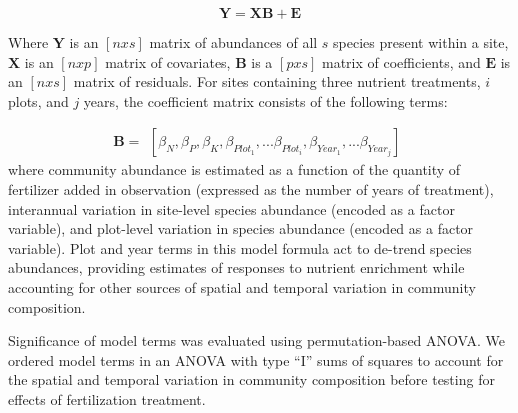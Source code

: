\documentclass[twoside,12pt,final]{ucthesis-CA2012}
\begin{document}
\begin{ucmainmatter}
\[\mathbf{Y} = \mathbf{XB} + \mathbf{E}\]

Where \(\mathbf{Y}\) is an \([n x s]\) matrix of abundances of all \(s\) species present within a site, \(\mathbf{X}\) is an \([n x p]\) matrix of covariates, \(\mathbf{B}\) is a \([p x s]\) matrix of coefficients, and \(\mathbf{E}\) is an \([n x s]\) matrix of residuals. For sites containing three nutrient treatments, \(i\) plots, and \(j\) years, the coefficient matrix consists of the following terms:

\[\mathbf{B} = \begin{matrix}
    [{\beta}_N, {\beta}_P , {\beta}_K, {\beta}_{Plot_1}, ... {\beta}_{Plot_i},
    {\beta}_{Year_1}, ... {\beta}_{Year_j}]
\end{matrix} \]
where community abundance is estimated as a function of the quantity of fertilizer added in observation (expressed as the number of years of treatment), interannual variation in site-level species abundance (encoded as a factor variable), and plot-level variation in species abundance (encoded as a factor variable). Plot and year terms in this model formula act to de-trend species abundances, providing estimates of responses to nutrient enrichment while accounting for other sources of spatial and temporal variation in community composition.

Significance of model terms was evaluated using permutation-based ANOVA. We ordered model terms in an ANOVA with type ``I'' sums of squares to account for the spatial and temporal variation in community composition before testing for effects of fertilization treatment.


\end{ucmainmatter}
\end{document}
